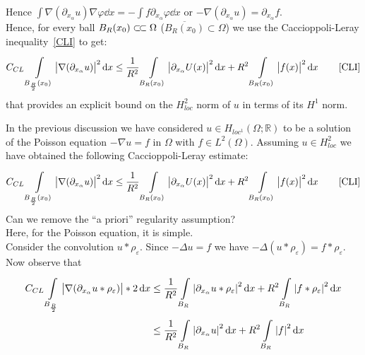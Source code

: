 Hence \( \int \nabla (\partial_{x_{\alpha }}u) \nabla \varphi  \dd{x} = -\int f \partial_{x_{\alpha }}\varphi  \dd{x} \) or \( -\nabla (\partial_{x_{\alpha }}u) = \partial_{x_{\alpha}}f \).\\
Hence, for every ball \( B_{R} (x_{0}) \ssubset \Omega  \) (\( \overline{B_{R} (x_{0})} \subset \Omega  \)) we use the Caccioppoli-Leray inequality~\eqref{CLI}  to get:
\begin{gather}
	C_{CL} \int\limits_{B_{\frac{R}{2}}(x_{0})}^{} \abs{\nabla (\partial_{x_{\alpha }}u) }^{2} \dd{x} \leq \frac{1}{R^{2}} \int\limits_{B_{R}(x_{0})}^{} \abs{\partial_{x_{\alpha }}U(x) }^{2} \dd{x} + R^{2} \int\limits_{B_{R}(x_{0})}^{} \abs{f(x) }^{2} \dd{x} \qquad \text{\eqref{CLI}}
\end{gather}
that provides an explicit bound on the \( H_{loc}^{2} \) norm of \( u \) in terms of its \( H^{1} \) norm.\\
\par
In the previous discussion we have considered \( u \in H_{loc^{1}}(\Omega ; \mathbb{R})  \) to be a solution of the Poisson equation \( -\nabla u = f \) in \( \Omega  \) with \( f \in L^{2}(\Omega ) \). Assuming \( u\in H_{loc}^{2} \) we have obtained the following Caccioppoli-Leray estimate:
\begin{gather}
	C_{CL} \int\limits_{B_{\frac{R}{2}}(x_{0})}^{} \abs{\nabla (\partial_{x_{\alpha }}u) }^{2} \dd{x} \leq \frac{1}{R^{2}} \int\limits_{B_{R}(x_{0})}^{} \abs{\partial_{x_{\alpha }}U(x) }^{2} \dd{x} + R^{2} \int\limits_{B_{R}(x_{0})}^{} \abs{f(x) }^{2} \dd{x} \qquad \text{\eqref{CLI}}
\end{gather}
Can we remove the \enquote{a priori} regularity assumption?\\
Here, for the Poisson equation, it is simple.\\
Consider the convolution \( u \ast \rho_{\varepsilon } \). Since \( -\Delta  u = f \) we have \( -\Delta  (u \ast \rho_{\varepsilon }) = f\ast \rho _{\varepsilon }\).\\
Now observe that
\begin{align}
	C_{CL} \int\limits_{B_{\frac{R}{2}}}^{} \abs{\nabla (\partial_{x_{\alpha }}u\ast \rho _{\varepsilon })}*2 \dd{x} & \leq \frac{1}{R^{2}}\int\limits_{B_{R}}^{} \abs{\partial_{x_{\alpha }}u \ast \rho _{\varepsilon }}^{2} \dd{x} + R^{2}\int\limits_{B_{R}}^{} \abs{f\ast \rho _{\varepsilon }}^{2} \dd{x}  \\
	                                                                                                                 & \leq  \frac{1}{R^{2}} \int\limits_{B_{R}}^{} \abs{\partial_{x_{\alpha }}u}^{2} \dd{x} + R^{2} \int\limits_{B_{R}}^{} \abs{f}^{2} \dd{x}
\end{align}
